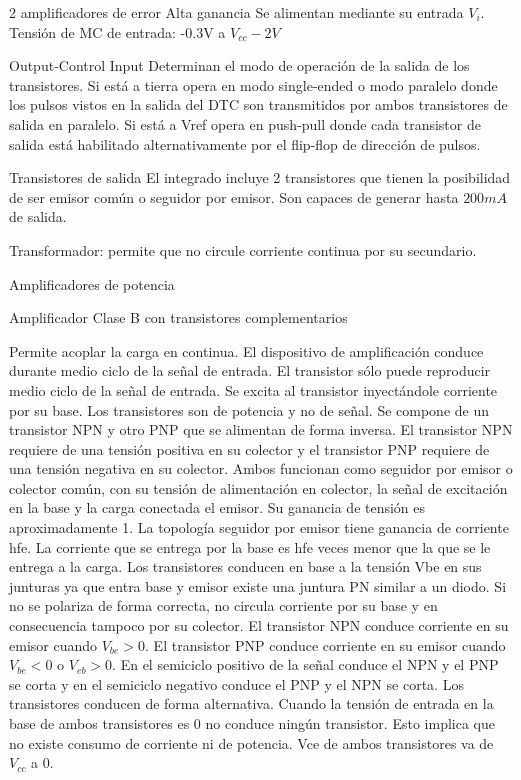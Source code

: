 2 amplificadores de error 
Alta ganancia
Se alimentan mediante su entrada $V_i$. 
Tensión de MC de entrada: -0.3V a $V_{cc}-2V$

Output-Control Input
Determinan el modo de operación de la salida de los transistores. 
Si está a tierra opera en modo single-ended o modo paralelo donde los pulsos vistos en la salida del DTC son transmitidos por ambos transistores de salida en paralelo.
Si está a Vref opera en push-pull donde cada transistor de salida está habilitado alternativamente por el flip-flop de dirección de pulsos.

Transistores de salida
El integrado incluye 2 transistores que tienen la posibilidad de ser emisor común o seguidor por emisor. 
Son capaces de generar hasta $200mA$ de salida. 


Transformador: permite que no circule corriente continua por su secundario. 

Amplificadores de potencia

Amplificador Clase B con transistores complementarios

Permite acoplar la carga en continua. 
El dispositivo de amplificación conduce durante medio ciclo de la señal de entrada. 
El transistor sólo puede reproducir medio ciclo de la señal de entrada. 
Se excita al transistor inyectándole corriente por su base.
Los transistores son de potencia y no de señal. 
Se compone de un transistor NPN y otro PNP que se alimentan de forma inversa.
El transistor NPN requiere de una tensión positiva en su colector y 
el transistor PNP requiere de una tensión negativa en su colector.
Ambos funcionan como seguidor por emisor o colector común, con su tensión de alimentación en colector, la señal de excitación en la base y la carga conectada el emisor. 
Su ganancia de tensión es aproximadamente 1. 
La topología seguidor por emisor tiene ganancia de corriente hfe. 
La corriente que se entrega por la base es hfe veces menor que la que se le entrega a la carga. 
Los transistores conducen en base a la tensión Vbe en sus junturas ya que entra base y emisor existe una juntura PN similar a un diodo. 
Si no se polariza de forma correcta, no circula corriente por su base y en consecuencia tampoco por su colector. 
El transistor NPN conduce corriente en su emisor cuando $V_{be}>0$. 
El transistor PNP conduce corriente en su emisor cuando $V_{be}<0$ o $V_{eb}>0$.
En el semiciclo positivo de la señal conduce el NPN y el PNP se corta y en el semiciclo negativo conduce el PNP y el NPN se corta. 
Los transistores conducen de forma alternativa. 
Cuando la tensión de entrada en la base de ambos transistores es 0 no conduce ningún transistor. 
Esto implica que no existe consumo de corriente ni de potencia. 
Vce de ambos transistores va de $V_{cc}$ a 0.

